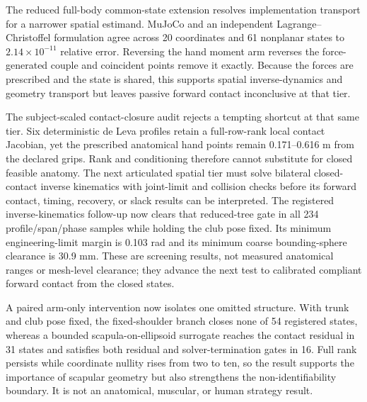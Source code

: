 \documentclass[
  letterpaper,
]{report}
\begin{document}
The reduced full-body common-state extension resolves implementation
transport for a narrower spatial estimand. MuJoCo and an independent
Lagrange--Christoffel formulation agree across 20 coordinates and 61
nonplanar states to \(2.14\times10^{-11}\) relative error. Reversing the
hand moment arm reverses the force-generated couple and coincident
points remove it exactly. Because the forces are prescribed and the
state is shared, this supports spatial inverse-dynamics and geometry
transport but leaves passive forward contact inconclusive at that tier.

The subject-scaled contact-closure audit rejects a tempting shortcut at
that same tier. Six deterministic de Leva profiles retain a
full-row-rank local contact Jacobian, yet the prescribed anatomical hand
points remain 0.171--0.616 m from the declared grips. Rank and
conditioning therefore cannot substitute for closed feasible anatomy.
The next articulated spatial tier must solve bilateral closed-contact
inverse kinematics with joint-limit and collision checks before its
forward contact, timing, recovery, or slack results can be interpreted.
The registered inverse-kinematics follow-up now clears that reduced-tree
gate in all 234 profile/span/phase samples while holding the club pose
fixed. Its minimum engineering-limit margin is 0.103 rad and its minimum
coarse bounding-sphere clearance is 30.9 mm. These are screening
results, not measured anatomical ranges or mesh-level clearance; they
advance the next test to calibrated compliant forward contact from the
closed states.

A paired arm-only intervention now isolates one omitted structure. With
trunk and club pose fixed, the fixed-shoulder branch closes none of 54
registered states, whereas a bounded scapula-on-ellipsoid surrogate
reaches the contact residual in 31 states and satisfies both residual
and solver-termination gates in 16. Full rank persists while coordinate
nullity rises from two to ten, so the result supports the importance of
scapular geometry but also strengthens the non-identifiability boundary.
It is not an anatomical, muscular, or human strategy result.
\end{document}
